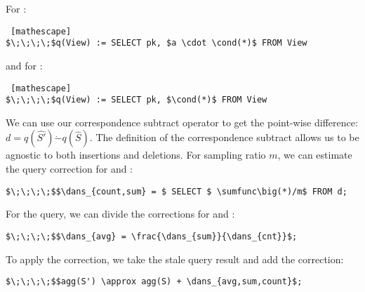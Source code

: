 \vspace{.5em}

\noindent For \sumfunc:
\begin{lstlisting} [mathescape]
$\;\;\;\;$q(View) := SELECT pk, $a \cdot \cond(*)$ FROM View
\end{lstlisting}

\noindent and for \countfunc:
\begin{lstlisting} [mathescape]
$\;\;\;\;$q(View) := SELECT pk, $\cond(*)$ FROM View
\end{lstlisting}

We can use our correspondence subtract operator to get the point-wise difference:
$d = q(\hat{S'}) \dot{-} q(\hat{S})$.  
The definition of the correspondence subtract allows us to be agnostic to both insertions and deletions.
For sampling ratio $m$, we can estimate the query correction for \sumfunc and \countfunc:
\begin{lstlisting}[mathescape,basicstyle={\scriptsize}]
$\;\;\;\;$$\dans_{count,sum} = $ SELECT $ \sumfunc\big(*)/m$ FROM d;
\end{lstlisting}
For the \avgfunc query, we can divide the corrections for \sumfunc and \countfunc:
\begin{lstlisting}[mathescape,basicstyle={\scriptsize}]
$\;\;\;\;$$\dans_{avg} = \frac{\dans_{sum}}{\dans_{cnt}}$;
\end{lstlisting}
To apply the correction, we take the stale query result and add the correction:
\begin{lstlisting}[mathescape,basicstyle={\scriptsize}]
$\;\;\;\;$$agg(S') \approx agg(S) + \dans_{avg,sum,count}$;
\end{lstlisting}

\iffalse
\vspace{-1em}
\begin{lstlisting}[mathescape,basicstyle={\scriptsize}]
$\;\;\;\;$$\dans_{count} = $ SELECT $ \sumfunc\big(*)/m$ FROM d;
\end{lstlisting}
\vspace{-1em}

We use the estimated correction to correct the stale query result as follows:
\begin{lstlisting}[mathescape,basicstyle={\scriptsize}]
$\;\;\;\;$$\sumfunc(S') \approx \sumfunc(S) + \dans_{sum}$;
\end{lstlisting}
\vspace{-1em}
\begin{lstlisting}[mathescape,basicstyle={\scriptsize}]
$\;\;\;\;$$\countfunc(S') \approx \countfunc(S) + \dans_{count}$;
\end{lstlisting}
\vspace{-1em}
\fi

